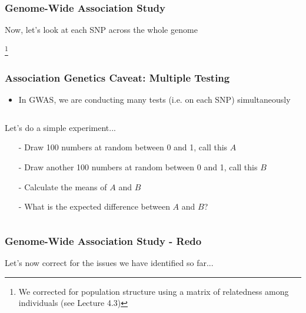 \documentclass[xcolor=dvipsnames]{beamer}
\newcommand\blfootnote[1]{%
	\begingroup
	\renewcommand\thefootnote{}\footnote{#1}%
	\addtocounter{footnote}{-1}%
	\endgroup
}
\begin{document}
\begin{frame}
	\frametitle{Genome-Wide Association Study}
	Now, let's look at each SNP across the whole genome 
	
	
	\blfootnote{We corrected for population structure using a matrix of relatedness among individuals (see Lecture 4.3)}
\end{frame}


\begin{frame}	
	\frametitle{Association Genetics Caveat: Multiple Testing}
\begin{itemize}	
\item In GWAS, we are conducting many tests (i.e. on each SNP) simultaneously
\end{itemize} \pause


\begin{columns}
	\begin{column}{0.5\textwidth}
		Let's do a simple experiment...\\
		\begin{itemize}
			\item[-] Draw 100 numbers at random between 0 and 1, call this $A$ \pause
			\item[-] Draw another 100 numbers at random between 0 and 1, call this $B$ \pause
			\item[-] Calculate the means of $A$ and $B$ \pause
			\item[-] What is the expected difference between $A$ and $B$? \pause
			\end{itemize}
		
		
	\end{column}
	\begin{column}{0.5\textwidth}
	\end{column}
\end{columns}





\end{frame}

\begin{frame}
		\frametitle{Genome-Wide Association Study - Redo}

Let's now correct for the issues we have identified so far...

\end{frame}
\end{document}
